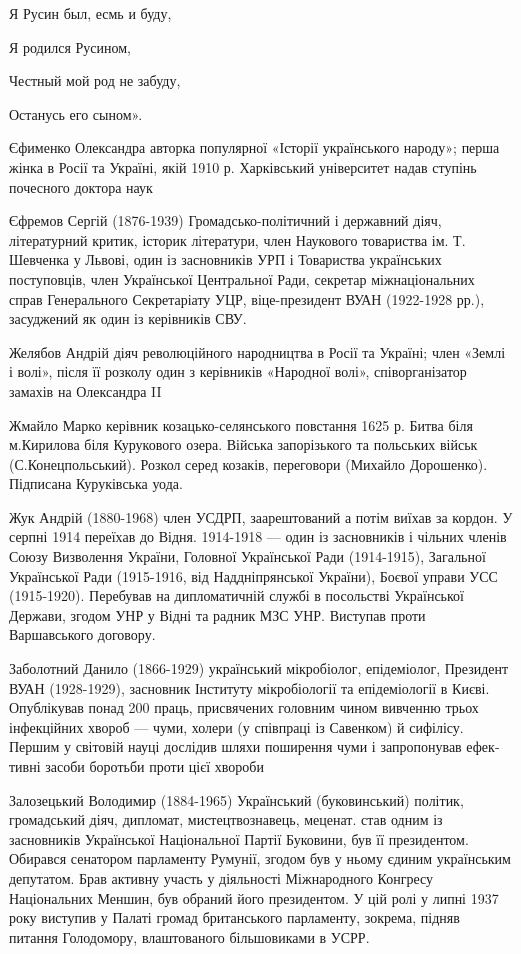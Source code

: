 Я Русин был, есмь и буду,

Я родился Русином,

Честный мой род не забуду,

Останусь его сыном».

Єфименко Олександра  авторка популярної «Історії українського народу»; перша жінка в Росії та Україні, якій 1910 р. Харківський університет надав ступінь почесного доктора наук

Єфремов Сергій (1876-1939) Громадсько-політичний і державний діяч, літературний критик, історик літератури, член Наукового товариства ім. Т. Шевченка у Львові, один із засновників УРП і Товариства українських поступовців, член Української Центральної Ради, секретар міжнаціональних справ Генерального Секретаріату УЦР, віце-президент ВУАН (1922-1928 рр.), засуджений як один із керівників СВУ.

Желябов Андрій діяч революційного народництва в Росії та Україні; член «Землі і волі», після її розколу один з керівників «Народної волі», співорганізатор замахів на Олександра II 

Жмайло  Марко керівник козацько-селянського повстання 1625 р. Битва біля м.Кирилова біля Курукового озера. Війська запорізького та польських військ (С.Конецпольський). Розкол серед козаків, переговори (Михайло Дорошенко). Підписана Куруківська уода.

Жук Андрій (1880-1968) член УСДРП, заарештований а потім  виїхав за кордон. У серпні 1914 переїхав до Відня. 1914-1918 --- один із засновників і чільних членів Союзу Визволення України, Головної Української Ради (1914-1915), Загальної Української Ради (1915-1916, від Наддніпрянської України), Боєвої управи УСС (1915-1920). Перебував на дипломатичній службі в посольстві Української Держави, згодом УНР у Відні та радник МЗС УНР. Виступав проти Варшавського договору.  

Заболотний Данило (1866-1929) український мікробіолог, епідеміолог, Президент ВУАН (1928-1929), засновник Інституту мікробіології та епідеміології в Києві. Опублікував понад 200 праць, присвячених головним чином вивченню трьох інфекційних хвороб --- чуми, холери (у співпраці із Савенком) й сифілісу. Першим у світовій науці дослідив шляхи поширення чуми і запропонував ефек­тивні засоби боротьби проти цієї хвороби

Залозецький Володимир (1884-1965) Український (буковинський) політик, громадський діяч, дипломат, мистецтвознавець, меценат. став одним із засновників Української Національної Партії Буковини, був її президентом. Обирався сенатором парламенту Румунії, згодом був у ньому єдиним українським депутатом. Брав активну участь у діяльності Міжнародного Конгресу Національних Меншин, був обраний його президентом. У цій ролі у липні 1937 року виступив у Палаті громад британського парламенту, зокрема, підняв питання Голодомору, влаштованого більшовиками в УСРР.

